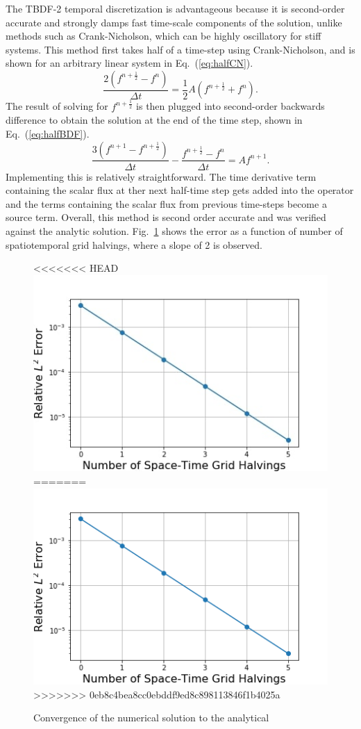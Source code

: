 \documentclass{style/nseJournal}
\newcommand{\fn}[1]{\left( #1 \right)}
\newcommand{\be}{\begin{equation}}
\newcommand{\ee}{\end{equation}}
\newcommand{\LEQ}[1]{\label{eq:#1}}
\newcommand{\EQ}[1]{Eq.~(\ref{eq:#1})}
\newcommand{\LFI}[1]{\label{fi:#1}}
\newcommand{\FI}[1]{Fig.~\ref{fi:#1}}
\newcommand{\bfg}{\begin{figure}}
\newcommand{\efg}{\end{figure}}
\newcommand{\half}{\frac{1}{2}}
\begin{document}
The TBDF-2 temporal discretization is advantageous because it is second-order accurate and strongly damps fast time-scale components of the solution, unlike methods such as Crank-Nicholson, which can be highly oscillatory for stiff systems.  
This method first takes half of a time-step using Crank-Nicholson, and is shown for an arbitrary linear system in \EQ{halfCN}.  
\be
	\frac{2 \fn{ f^{n+\half} - f^n }}{\Delta t} =  \half A \fn{f^{n+\half} + f^n}.
	\LEQ{halfCN} 
\ee
The result of solving for $f^{n+\half}$ is then plugged into second-order backwards difference to obtain the solution at the end of the time step, shown in \EQ{halfBDF}.  
\be
	\frac{3 \fn{ f^{n+1} - f^{n+\half} }}{\Delta t} - \frac{f^{n+\half} - 
		f^n}{\Delta t} = A f^{n+1}.
	\LEQ{halfBDF} 
\ee 
Implementing this is relatively straightforward. 
The time derivative term containing the scalar flux at ther next half-time step gets added into the operator and the terms containing the scalar flux from previous time-steps become a source term.  
Overall, this method is second order accurate and was verified against the analytic solution.  
\FI{2ord} shows the error as a function of number of spatiotemporal grid halvings, where a slope of 2 is observed.
\bfg[h] \centering
<<<<<<< HEAD
	\includegraphics[scale=0.5]{figures/method_convergence.jpg}
=======
	\includegraphics[scale=0.5]{figures/method_convergence.png}
>>>>>>> 0eb8c4bea8cc0ebddf9ed8c898113846f1b4025a
	\caption{Convergence of the numerical solution to the analytical}
	\LFI{2ord}
\efg
\end{document}
